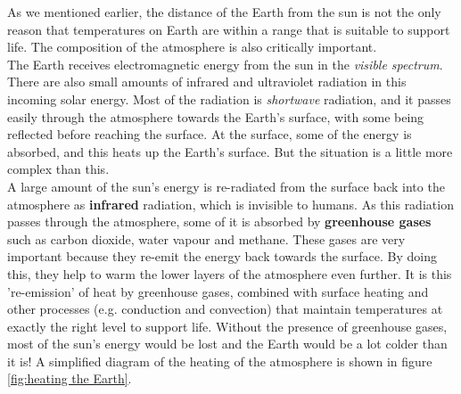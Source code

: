 As we mentioned earlier, the distance of the Earth from the sun is not the only reason that temperatures on Earth are within a range that is suitable to support life. The composition of the atmosphere is also critically important. \\

The Earth receives electromagnetic energy from the sun in the \textit{visible spectrum}. There are also small amounts of infrared and ultraviolet radiation in this incoming solar energy. Most of the radiation is \textit{shortwave} radiation, and it passes easily through the atmosphere towards the Earth's surface, with some being reflected before reaching the surface. At the surface, some of the energy is absorbed, and this heats up the Earth's surface. But the situation is a little more complex than this. \\

A large amount of the sun's energy is re-radiated from the surface back into the atmosphere as \textbf{infrared} radiation, which is invisible to humans. As this radiation passes through the atmosphere, some of it is absorbed by \textbf{greenhouse gases} such as carbon dioxide, water vapour and methane. These gases are very important because they re-emit the energy back towards the surface. By doing this, they help to warm the lower layers of the atmosphere even further. It is this 're-emission' of heat by greenhouse gases, combined with surface heating and other processes (e.g. conduction and convection) that maintain temperatures at exactly the right level to support life. Without the presence of greenhouse gases, most of the sun's energy would be lost and the Earth would be a lot colder than it is! A simplified diagram of the heating of the atmosphere is shown in figure \ref{fig:heating the Earth}.



